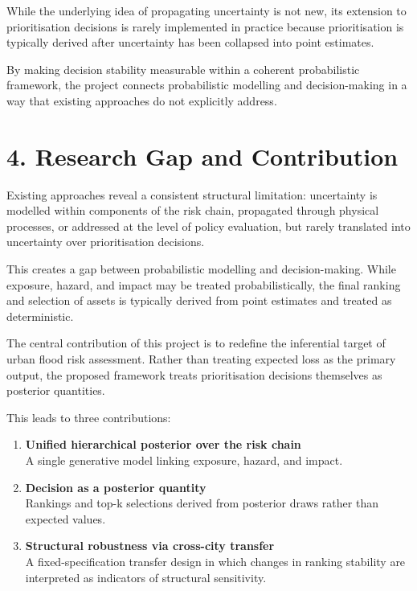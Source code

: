 \documentclass[
]{article}
\begin{document}
While the underlying idea of propagating uncertainty is not new, its
extension to prioritisation decisions is rarely implemented in practice
because prioritisation is typically derived after uncertainty has been
collapsed into point estimates.

By making decision stability measurable within a coherent probabilistic
framework, the project connects probabilistic modelling and
decision-making in a way that existing approaches do not explicitly
address.

\section{4. Research Gap and
Contribution}\label{research-gap-and-contribution}

Existing approaches reveal a consistent structural limitation:
uncertainty is modelled within components of the risk chain, propagated
through physical processes, or addressed at the level of policy
evaluation, but rarely translated into uncertainty over prioritisation
decisions.

This creates a gap between probabilistic modelling and decision-making.
While exposure, hazard, and impact may be treated probabilistically, the
final ranking and selection of assets is typically derived from point
estimates and treated as deterministic.

The central contribution of this project is to redefine the inferential
target of urban flood risk assessment. Rather than treating expected
loss as the primary output, the proposed framework treats prioritisation
decisions themselves as posterior quantities.

This leads to three contributions:

\begin{enumerate}
\def\labelenumi{\arabic{enumi}.}
\item
  \textbf{Unified hierarchical posterior over the risk chain}\\
  A single generative model linking exposure, hazard, and impact.
\item
  \textbf{Decision as a posterior quantity}\\
  Rankings and top-k selections derived from posterior draws rather than
  expected values.
\item
  \textbf{Structural robustness via cross-city transfer}\\
  A fixed-specification transfer design in which changes in ranking
  stability are interpreted as indicators of structural sensitivity.
\end{enumerate}
\end{document}
